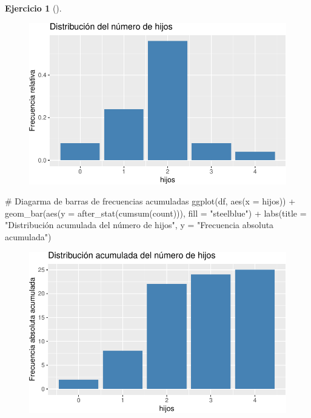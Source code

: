 \documentclass[
  a4paper,
]{scrreport}
\newenvironment{Shaded}{\begin{snugshade}}{\end{snugshade}}
\newcommand{\AttributeTok}[1]{\textcolor[rgb]{0.40,0.45,0.13}{#1}}
\newcommand{\CommentTok}[1]{\textcolor[rgb]{0.37,0.37,0.37}{#1}}
\newcommand{\FunctionTok}[1]{\textcolor[rgb]{0.28,0.35,0.67}{#1}}
\newcommand{\NormalTok}[1]{\textcolor[rgb]{0.00,0.23,0.31}{#1}}
\newcommand{\SpecialCharTok}[1]{\textcolor[rgb]{0.37,0.37,0.37}{#1}}
\newcommand{\StringTok}[1]{\textcolor[rgb]{0.13,0.47,0.30}{#1}}
\theoremstyle{definition}
\newtheorem{exercise}{Ejercicio}[chapter]
\theoremstyle{remark}
\begin{document}
\begin{exercise}[]
\begin{enumerate}
\begin{tcolorbox}
  \begin{figure}[H]

  {\centering \includegraphics{03-frecuencias-graficos_files/figure-pdf/unnamed-chunk-7-2.pdf}

  }

  \end{figure}

\begin{Shaded}
\begin{Highlighting}[]
\CommentTok{\# Diagarma de barras de frecuencias acumuladas}
\FunctionTok{ggplot}\NormalTok{(df, }\FunctionTok{aes}\NormalTok{(}\AttributeTok{x =}\NormalTok{ hijos)) }\SpecialCharTok{+}
    \FunctionTok{geom\_bar}\NormalTok{(}\FunctionTok{aes}\NormalTok{(}\AttributeTok{y =} \FunctionTok{after\_stat}\NormalTok{(}\FunctionTok{cumsum}\NormalTok{(count))), }\AttributeTok{fill =} \StringTok{"steelblue"}\NormalTok{) }\SpecialCharTok{+}
    \FunctionTok{labs}\NormalTok{(}\AttributeTok{title =} \StringTok{"Distribución acumulada del número de hijos"}\NormalTok{, }\AttributeTok{y =} \StringTok{"Frecuencia absoluta acumulada"}\NormalTok{)}
\end{Highlighting}
\end{Shaded}

  \begin{figure}[H]

  {\centering \includegraphics{03-frecuencias-graficos_files/figure-pdf/unnamed-chunk-7-3.pdf}

}
\end{figure}
\end{tcolorbox}
\end{enumerate}
\end{exercise}
\end{document}
